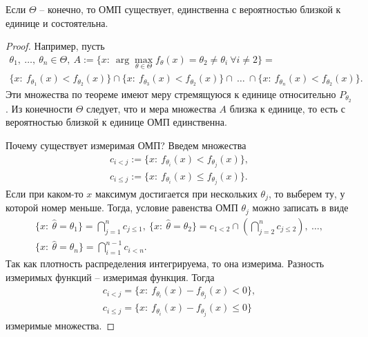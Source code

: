 \begin{corollary}
    Если $\displaystyle \Theta $ -- конечно, то ОМП существует, единственна с вероятностью близкой к единице и состоятельна.
\end{corollary}
\begin{unnecessary}
\begin{proof}
    Например, пусть
        \begin{gather*}
        \theta _{1} ,\ \dotsc ,\ \theta _{n} \in \Theta ,\ A:=\{x:\ \arg\max_{\theta \in \Theta } f_{\theta }( x) =\theta _{2} \neq \theta _{i} \ \forall i\neq 2\} =\\
        \{x:\ f_{\theta _{1}}( x) < f_{\theta _{2}}( x)\} \cap \{x:\ f_{\theta _{3}}( x) < f_{\theta _{2}}( x)\} \cap \ \dotsc \ \cap \{x:\ f_{\theta _{n}}( x) < f_{\theta _{2}}( x)\} .
    \end{gather*}
    Эти множества по теореме имеют меру стремящуюся к единице относительно $\displaystyle P_{\theta _{2}}$. Из конечности $\displaystyle \Theta $ следует, что и мера множества $\displaystyle A$ близка к единице, то есть с вероятностью близкой к единице ОМП единственна. 
    
    Почему существует измеримая ОМП? Введем множества
    \begin{gather*}
        c_{i< j} :=\{x:\ f_{\theta _{i}}( x) < f_{\theta _{j}}( x)\} ,\\
        c_{i\leqslant j} :=\{x:\ f_{\theta _{i}}( x) \leqslant f_{\theta _{j}}( x)\} .
    \end{gather*}
    Если при каком-то $\displaystyle x$ максимум достигается при нескольких $\displaystyle \theta _{j}$, то выберем ту, у которой номер меньше. Тогда, условие равенства ОМП $\displaystyle \theta _{j}$ можно записать в виде
    \begin{gather*}
        \{x:\ \hat{\theta } =\theta _{1}\} =\bigcap _{j=1}^{n} c_{j\leqslant 1} ,\ \{x:\ \hat{\theta } =\theta _{2}\} =c_{1< 2} \cap \left(\bigcap _{j=2}^{n} c_{j\leqslant 2}\right) ,\ \dotsc ,\\
        \{x:\ \hat{\theta } =\theta _{n}\} =\bigcap _{i=1}^{n-1} c_{i< n} .
    \end{gather*}
    Так как плотность распределения интегрируема, то она измерима. Разность измеримых функций -- измеримая функция. Тогда
    \begin{gather*}
        c_{i< j} =\{x:\ f_{\theta _{i}}( x) -f_{\theta _{j}}( x) < 0\} ,\\
        c_{i\leqslant j} =\{x:\ f_{\theta _{i}}( x) -f_{\theta _{j}}( x) \leqslant 0\}
    \end{gather*}
измеримые множества.
\end{proof}
\end{unnecessary}
